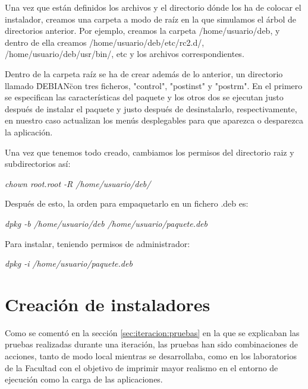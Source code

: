 


Una vez que están definidos los archivos y el directorio dónde los ha de colocar el instalador, creamos una carpeta a modo de raíz en la que simulamos el árbol de directorios anterior. Por ejemplo, creamos la carpeta /home/usuario/deb, y dentro de ella creamos /home/usuario/deb/etc/rc2.d/, /home/usuario/deb/usr/bin/, etc y los archivos correspondientes.
\newline

Dentro de la carpeta raíz se ha de crear además de lo anterior, un directorio llamado \"DEBIAN\" con tres ficheros, "control", "postinst" y "postrm". En el primero se especifican las características del paquete y los otros dos se ejecutan justo después de instalar el paquete y justo después de desinstalarlo, respectivamente, en nuestro caso actualizan los menús desplegables para que aparezca o desparezca la aplicación.
\newline

Una vez que tenemos todo creado, cambiamos los permisos del directorio raiz y subdirectorios así:

\begin{center}
    \emph{chown root.root -R /home/usuario/deb/}
\end{center}

Después de esto, la orden para empaquetarlo en un fichero .deb es:

\begin{center}
    \emph{dpkg -b /home/usuario/deb /home/usuario/paquete.deb}
\end{center}

Para instalar, teniendo permisos de administrador:

\begin{center}
    \emph{dpkg -i /home/usuario/paquete.deb}
\end{center}




\section{Creación de instaladores}
\label{sec:implementacion:pruebas}

Como se comentó en la sección \ref{sec:iteracion:pruebas} en la que se explicaban las pruebas realizadas durante una iteración, las pruebas han sido combinaciones de acciones, tanto de modo local mientras se desarrollaba, como en los laboratorios de la Facultad con el objetivo de imprimir mayor realismo en el entorno de ejecución como la carga de las aplicaciones.


